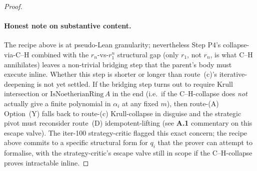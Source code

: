 \begin{proof}
\paragraph{Honest note on substantive content.} The recipe above
is at pseudo-Lean granularity; nevertheless Step P4's
collapse-via-C--H combined with the $r_n$-vs-$r_1^n$ structural
gap (only $r_1$, not $r_n$, is what C--H annihilates) leaves a
non-trivial bridging step that the parent's body must execute
inline. Whether this step is shorter or longer than route~(c)'s
iterative-deepening is not yet settled. If the bridging step turns
out to require Krull intersection or $\mathrm{IsNoetherianRing}\,A$
in the end (i.e.\ if the C--H-collapse does \emph{not} actually
give a finite polynomial in $\alpha_i$ at any fixed $m$), then
route-(A) Option~(Y) falls back to route-(c) Krull-collapse in
disguise and the strategic pivot must reconsider route~(D)
idempotent-lifting (see \textbf{A.1} commentary on this escape
valve). The iter-100 strategy-critic flagged this exact concern;
the recipe above commits to a specific structural form for $q_i$
that the prover can attempt to formalise, with the
strategy-critic's escape valve still in scope if the C--H-collapse
proves intractable inline.


\end{proof}
